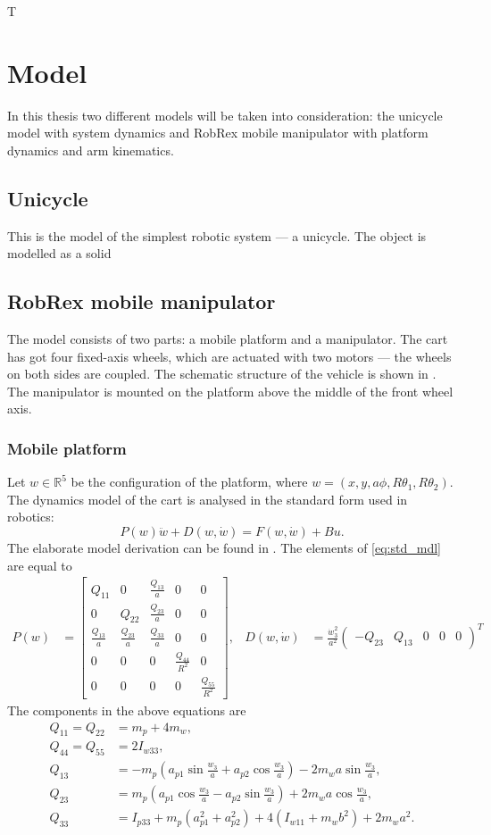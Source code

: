 T\chapter{Model}
In this thesis two different models will be taken into consideration: the unicycle model with system dynamics and RobRex mobile manipulator with platform dynamics and arm kinematics.
\section{Unicycle}
This is the model of the simplest robotic system --- a unicycle. The object is modelled as a solid 

\section{RobRex mobile manipulator}
The model consists of two parts: a mobile platform and a manipulator. The cart has got four fixed-axis wheels, which are actuated with two motors --- the wheels on both sides are coupled. The schematic structure of the vehicle is shown in . %
The manipulator is mounted on the platform above the middle of the front wheel axis.
\subsection{Mobile platform}
Let $w\in \mathbb{R}^5$ be the configuration of the platform, where
$w=(x, y, a\phi, R\theta_1, R\theta_2)$.  
The dynamics model of the cart is analysed in the standard form used in robotics:
\begin{equation}
\label{eq:std_mdl}
P(w)\ddot w + D(w, \dot w) = F(w, \dot w) + Bu.
\end{equation}
The elaborate model derivation can be found in \cite{coupled}. 
The elements of \eqref{eq:std_mdl} are equal to
\begin{align*}
P(w) &= \begin{bmatrix}
Q_{11} & 0 & \frac{Q_{13}}{a} & 0 & 0\\
0 & Q_{22} & \frac{Q_{23}}{a} & 0 & 0\\
\frac{Q_{13}}{a} & \frac{Q_{23}}{a} & \frac{Q_{33}}{a} & 0 & 0\\
0 & 0 & 0 & \frac{Q_{44}}{R^2} & 0 \\
0 & 0 & 0 & 0 & \frac{Q_{55}}{R^2}
\end{bmatrix}, & 
D(w, \dot w) &= \frac{\dot w_3^2}{a^2}\begin{pmatrix}
-Q_{23} & Q_{13} & 0 & 0 & 0
\end{pmatrix}^T
\end{align*}
The components in the above equations are
\begin{align*}
Q_{11} = Q_{22} &= m_p+4m_w,\\
Q_{44} = Q_{55} &= 2I_{w33},\\
Q_{13} &= -m_p(a_{p1}\sin\frac{w_3}{a}+a_{p2}\cos\frac{w_3}{a})- 2m_wa\sin\frac{w_3}{a},\\
Q_{23} &=  m_p(a_{p1}\cos\frac{w_3}{a}-a_{p2}\sin\frac{w_3}{a})+ 2m_wa\cos\frac{w_3}{a},\\
Q_{33} &= I_{p33}+m_p(a_{p1}^2+a_{p2}^2)+4(I_{w11}+m_wb^2)+2m_wa^2.
\end{align*}

